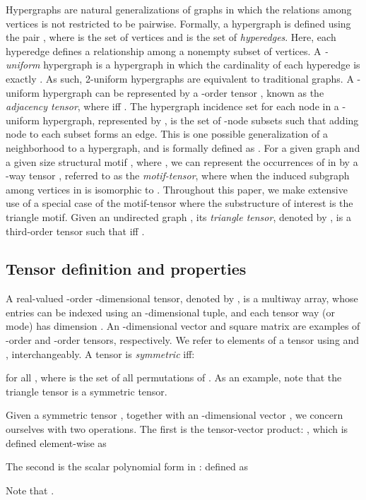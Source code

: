 \documentclass[10pt, journal, compsoc, final]{IEEEtran}
\begin{document}
Hypergraphs are natural generalizations of graphs in which the relations among vertices is
not restricted to be pairwise. Formally, a hypergraph is defined using the pair
, where  is the set of vertices and
 is the set of \textit{hyperedges}. Here, each hyperedge defines a relationship
among a nonempty subset of vertices. A \textit{-uniform} hypergraph is a hypergraph in
which the cardinality of each hyperedge is exactly . As such, 2-uniform hypergraphs are
equivalent to traditional graphs. A -uniform hypergraph can be represented by a -order
tensor , known as the \textit{adjacency tensor}, where
 iff .
The hypergraph incidence set for each node  in a -uniform hypergraph, represented by
, is the set of -node subsets such that adding node  to each
subset forms an edge. This is one possible generalization of a neighborhood to a hypergraph,
and is formally defined as . For a given graph  and a given size
 structural motif , where , we can
represent the occurrences of  in  by a -way tensor ,
referred to as the \textit{motif-tensor}, where  when the
induced subgraph among vertices  in  is isomorphic to
. Throughout this paper, we make extensive use of a special case of the motif-tensor
where the substructure of interest is the triangle motif. Given an undirected graph
, its \textit{triangle tensor}, denoted by , is a
third-order tensor such that  iff  .

\subsection{Tensor definition and properties}
A real-valued -order -dimensional tensor, denoted by , is a
multiway array, whose entries can be indexed using an -dimensional tuple, and each tensor
way (or mode) has dimension . An -dimensional vector and square matrix are examples
of -order and -order tensors, respectively. We refer to elements of a
tensor  using  and
, interchangeably. A tensor  is \textit{symmetric} iff:

for all , where  is the set of all permutations of . 
As an example, note that the triangle tensor is a symmetric tensor. 

Given a symmetric tensor , together with an -dimensional vector
, we concern ourselves with two operations. The first is the 
tensor-vector product: , which is defined element-wise as

The second is the scalar polynomial form in :  defined as

Note that .
\end{document}
